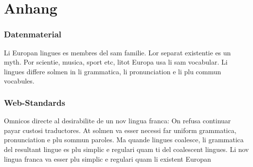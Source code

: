 \documentclass[paper=a4,fontsize=12pt,ngerman]{scrartcl}
\begin{document}
\clearpage
\appendix
\part*{Anhang}

\section{Datenmaterial}
Li Europan lingues es membres del sam familie. Lor separat existentie es un 
myth. Por scientie, musica, sport etc, litot Europa usa li sam vocabular. Li 
lingues differe solmen in li grammatica, li pronunciation e li plu commun 
vocabules.

\section{Web-Standards}
Omnicos directe al desirabilite de un nov lingua franca: On refusa continuar 
payar custosi traductores. At solmen va esser necessi far uniform grammatica, 
pronunciation e plu sommun paroles. Ma quande lingues coalesce, li grammatica 
del resultant lingue es plu simplic e regulari quam ti del coalescent 
lingues. Li nov lingua franca va esser plu simplic e regulari quam li 
existent Europan
\end{document}
